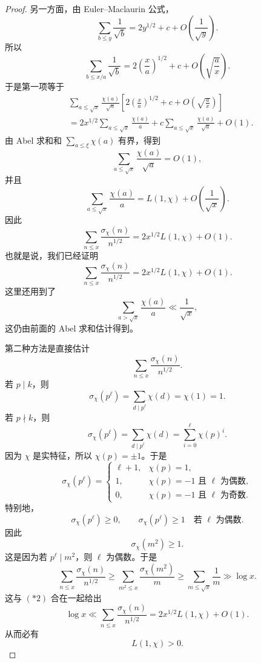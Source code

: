 \begin{proof}
	另一方面，由 Euler--Maclaurin 公式，
	\[
		\sum_{b\leq y}\frac{1}{\sqrt{b}}
		=
		2y^{1/2}+c+O\left(\frac{1}{\sqrt y}\right).
	\]
	所以
	\[
		\sum_{b\leq x/a}\frac{1}{\sqrt b}
		=
		2\left(\frac{x}{a}\right)^{1/2}
		+c
		+O\left(\sqrt{\frac{a}{x}}\right).
	\]
	于是第一项等于
	\[
\begin{aligned}
	&\sum_{a\leq\sqrt{x}}\frac{\chi(a)}{\sqrt a}
	\left[
	2\left(\frac{x}{a}\right)^{1/2}
	+c
	+O\left(\sqrt{\frac{a}{x}}\right)
	\right]  \\
	&=
	2x^{1/2}\sum_{a\leq\sqrt{x}}\frac{\chi(a)}{a}
	+
	c\sum_{a\leq\sqrt{x}}\frac{\chi(a)}{\sqrt a}
	+O(1).
\end{aligned}
	\]
	由 Abel 求和和 $\sum_{a\leq \xi}\chi(a)$ 有界，得到
	\[
		\sum_{a\leq\sqrt{x}}\frac{\chi(a)}{\sqrt a}=O(1),
	\]
	并且
	\[
		\sum_{a\leq\sqrt{x}}\frac{\chi(a)}{a}
		=
		L(1,\chi)+O\left(\frac{1}{\sqrt{x}}\right).
	\]
	因此
	\[
		\sum_{n\leq x}\frac{\sigma_\chi(n)}{n^{1/2}}
		=
		2x^{1/2}L(1,\chi)+O(1).
	\]
	也就是说，我们已经证明
	\begin{equation}
		\sum_{n\leq x}\frac{\sigma_\chi(n)}{n^{1/2}}
		=
		2x^{1/2}L(1,\chi)+O(1).
		\tag{\(*2\)}
	\end{equation}
	这里还用到了
	\[
		\sum_{a>\sqrt{x}}\frac{\chi(a)}{a}\ll \frac{1}{\sqrt{x}},
	\]
	这仍由前面的 Abel 求和估计得到。


	第二种方法是直接估计
	\[
		\sum_{n\leq x}\frac{\sigma_\chi(n)}{n^{1/2}}.
	\]
	若 $p\mid k$，则
	\[
		\sigma_\chi(p^\ell)
		=
		\sum_{d\mid p^\ell}\chi(d)
		=
		\chi(1)=1.
	\]
	若 $p\nmid k$，则
	\[
		\sigma_\chi(p^\ell)
		=
		\sum_{d\mid p^\ell}\chi(d)
		=
		\sum_{i=0}^{\ell}\chi(p)^i.
	\]
	因为 $\chi$ 是实特征，所以 $\chi(p)=\pm1$。于是
	\[
		\sigma_\chi(p^\ell)
		=
		\begin{cases}
			\ell+1, & \chi(p)=1,\\
			1, & \chi(p)=-1 \text{ 且 } \ell \text{ 为偶数},\\
			0, & \chi(p)=-1 \text{ 且 } \ell \text{ 为奇数}.
		\end{cases}
	\]
	特别地，
	\[
		\sigma_\chi(p^\ell)\geq 0,
		\qquad
		\sigma_\chi(p^\ell)\geq 1 \quad\text{若 } \ell \text{ 为偶数}.
	\]
	因此
	\[
		\sigma_\chi(m^2)\geq 1.
	\]
	这是因为若 $p^\ell\mid m^2$，则 $\ell$ 为偶数。于是
	\[
		\sum_{n\leq x}\frac{\sigma_\chi(n)}{n^{1/2}}
		\geq
		\sum_{m^2\leq x}\frac{\sigma_\chi(m^2)}{m}
		\geq
		\sum_{m\leq \sqrt{x}}\frac{1}{m}
		\gg \log x.
	\]
	这与 \((\ast2)\) 合在一起给出
	\[
		\log x
		\ll
		\sum_{n\leq x}\frac{\sigma_\chi(n)}{n^{1/2}}
		=
		2x^{1/2}L(1,\chi)+O(1).
	\]
	从而必有
	\[
		L(1,\chi)>0.
	\]
\end{proof}

